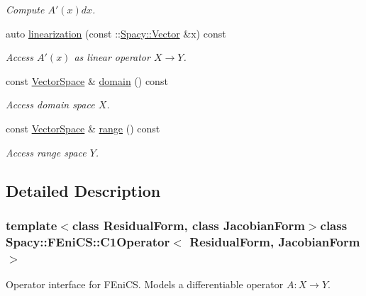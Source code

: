 \begin{DoxyCompactItemize}
\begin{DoxyCompactList}\small\item\em \-Compute $A'(x)dx$. \end{DoxyCompactList}\item 
auto \hyperlink{classSpacy_1_1FEniCS_1_1C1Operator_aab603c2b35f2b710b2e646cf3fb7ee9c}{linearization} (const \-::\hyperlink{classSpacy_1_1Vector}{\-Spacy\-::\-Vector} \&x) const 
\begin{DoxyCompactList}\small\item\em \-Access $A'(x)$ as linear operator $X\rightarrow Y$. \end{DoxyCompactList}\item 
\hypertarget{classSpacy_1_1OperatorBase_a2588f9b3e0188820c4c494e63293dc6f}{const \hyperlink{classSpacy_1_1VectorSpace}{\-Vector\-Space} \& \hyperlink{classSpacy_1_1OperatorBase_a2588f9b3e0188820c4c494e63293dc6f}{domain} () const }\label{classSpacy_1_1OperatorBase_a2588f9b3e0188820c4c494e63293dc6f}

\begin{DoxyCompactList}\small\item\em \-Access domain space $X$. \end{DoxyCompactList}\item 
\hypertarget{classSpacy_1_1OperatorBase_ab19d3b7a6f290b1079248f1e567e53d6}{const \hyperlink{classSpacy_1_1VectorSpace}{\-Vector\-Space} \& \hyperlink{classSpacy_1_1OperatorBase_ab19d3b7a6f290b1079248f1e567e53d6}{range} () const }\label{classSpacy_1_1OperatorBase_ab19d3b7a6f290b1079248f1e567e53d6}

\begin{DoxyCompactList}\small\item\em \-Access range space $Y$. \end{DoxyCompactList}\end{DoxyCompactItemize}


\subsection{\-Detailed \-Description}
\subsubsection*{template$<$class Residual\-Form, class Jacobian\-Form$>$class Spacy\-::\-F\-Eni\-C\-S\-::\-C1\-Operator$<$ Residual\-Form, Jacobian\-Form $>$}

\-Operator interface for \-F\-Eni\-C\-S. \-Models a differentiable operator $A:X\rightarrow Y$. 

